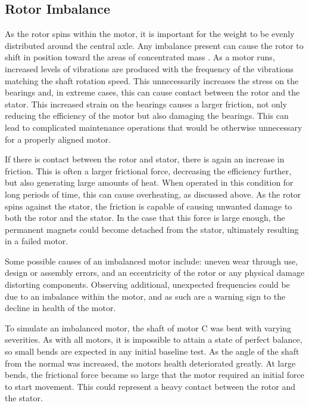 \subsection{Rotor Imbalance}
As the rotor spins within the motor, it is important for the weight to be evenly distributed around the central axle. Any imbalance present can cause the rotor to shift in position toward the areas of concentrated mass \cite{xu1994vibration}. As a motor runs, increased levels of vibrations are produced with the frequency of the vibrations matching the shaft rotation speed. This unnecessarily increases the stress on the bearings and, in extreme cases, this can cause contact between the rotor and the stator. This increased strain on the bearings causes a larger friction, not only reducing the efficiency of the motor but also damaging the bearings. This can lead to complicated maintenance operations that would be otherwise unnecessary for a properly aligned motor.

If there is contact between the rotor and stator, there is again an increase in friction. This is often a larger frictional force, decreasing the efficiency further, but also generating large amounts of heat. When operated in this condition for long periods of time, this can cause overheating, as discussed above. As the rotor spins against the stator, the friction is capable of causing unwanted damage to both the rotor and the stator. In the case that this force is large enough, the permanent magnets could become detached from the stator, ultimately resulting in a failed motor.

Some possible causes of an imbalanced motor include: uneven wear through use, design or assembly errors, and an eccentricity of the rotor or any physical damage distorting components. Observing additional, unexpected frequencies could be due to an imbalance within the motor, and as such are a warning sign to the decline in health of the motor. 


To simulate an imbalanced motor, the shaft of motor C was bent with varying severities. 
As with all motors, it is impossible to attain a state of perfect balance, so small bends are expected in any initial baseline test. As the angle of the shaft from the normal was increased, the motors health deteriorated greatly. At large bends, the frictional force became so large that the motor required an initial force to start movement. This could represent a heavy contact between the rotor and the stator. 

